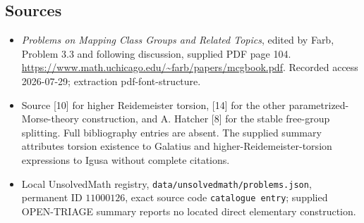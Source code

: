 \documentclass[11pt]{article}
\begin{document}
\subsection{Sources}
\begin{itemize}
\item \emph{Problems on Mapping Class Groups and Related Topics}, edited by Farb, Problem 3.3 and following discussion, supplied PDF page 104. \url{https://www.math.uchicago.edu/~farb/papers/mcgbook.pdf}. Recorded access 2026-07-29; extraction pdf-font-structure.
\item Source [10] for higher Reidemeister torsion, [14] for the other parametrized-Morse-theory construction, and A. Hatcher [8] for the stable free-group splitting. Full bibliography entries are absent. The supplied summary attributes torsion existence to Galatius and higher-Reidemeister-torsion expressions to Igusa without complete citations.
\item Local UnsolvedMath registry, \texttt{data/unsolvedmath/problems.json}, permanent ID \(11000126\), exact source code \texttt{catalogue entry}; supplied OPEN-TRIAGE summary reports no located direct elementary construction.
\end{itemize}
\end{document}
